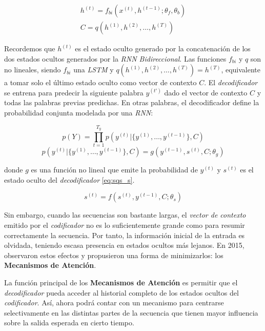 \begin{equation}
    \begin{split}
        h^{(t)} = f_{bi}(x^{(t)}, h^{(t-1)}; \theta_{f}, \theta_{b}) \\
        C = q({h^{(1)}, h^{(2)}, \dots, h^{(T)}})
    \end{split}
    \label{eq:s2s_simple}
\end{equation}

Recordemos que $h^{(t)}$ es el estado oculto generado por la concatenación de los dos estados
ocultos generados por la \textit{RNN Bidireccional}. Las funciones $f_{bi}$ y $q$ son no lineales,
siendo $f_{bi}$ una \textit{LSTM} y $q(h^{(1)}, h^{(2)}, \dots, h^{(T)}) = h^{(T)}$, equivalente a
tomar solo el último estado oculto como vector de contexto $C$. El \textit{decodificador} se entrena
para predecir la siguiente palabra $y^{(t')}$ dado el vector de contexto $C$ y todas las palabras
previas predichas. En otras palabras, el decodificador define la probabilidad conjunta modelada por
una \textit{RNN}:

\begin{equation}
    p(Y) = \prod_{t=1}^{T_y} p(y^{(t)} | \{y^{(1)}, \dots , y^{(t-1)}\}, C)
\end{equation}
\begin{equation}
    p(y^{(t)} | \{y^{(1)}, \dots , y^{(t-1)}\}, C) = g(y^{(t-1)}, s^{(t)}, C; \theta_g)
\end{equation}

\noindent donde $g$ es una función no lineal que emite la probabilidad de $y^{(t)}$ y $s^{(t)}$ es el
estado oculto del \textit{decodificador} \ref{eq:sqs_s}.

\begin{equation}
    s^{(t)} = f(s^{(t)}, y^{(t-1)}, C; \theta_s)
    \label{eq:sqs_s}
\end{equation}


Sin embargo, cuando las secuencias son bastante largas, el \textit{vector de contexto} emitido por el
\textit{codificador} no es lo suficientemente grande como para resumir correctamente la secuencia.
Por tanto, la información inicial de la entrada es olvidada, teniendo escasa presencia en estados
ocultos más lejanos. En 2015, \citeauthor{bahdanau2016neural} observaron estos efectos y propusieron
una forma de minimizarlos: los \textbf{Mecanismos de Atención}.

La función principal de los \textbf{Mecanismos de Atención} es permitir que el \textit{decodificador}
pueda acceder al historial completo de los estados ocultos del \textit{codificador}. Así, ahora podrá
contar con un mecanismo para centrarse selectivamente en las distintas partes de la secuencia que
tienen mayor influencia sobre la salida esperada en cierto tiempo.

